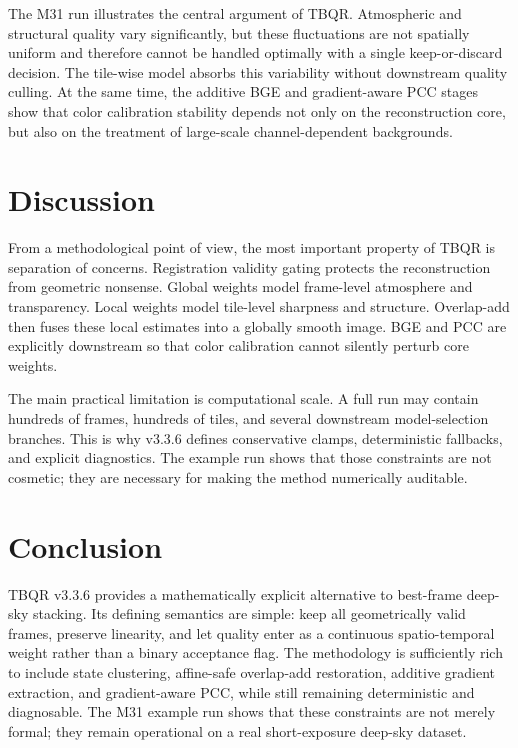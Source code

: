 \documentclass[10pt,twocolumn]{article}
\begin{document}
The M31 run illustrates the central argument of TBQR. Atmospheric and structural quality vary significantly, but these fluctuations are not spatially uniform and therefore cannot be handled optimally with a single keep-or-discard decision. The tile-wise model absorbs this variability without downstream quality culling. At the same time, the additive BGE and gradient-aware PCC stages show that color calibration stability depends not only on the reconstruction core, but also on the treatment of large-scale channel-dependent backgrounds.

\section{Discussion}

From a methodological point of view, the most important property of TBQR is separation of concerns. Registration validity gating protects the reconstruction from geometric nonsense. Global weights model frame-level atmosphere and transparency. Local weights model tile-level sharpness and structure. Overlap-add then fuses these local estimates into a globally smooth image. BGE and PCC are explicitly downstream so that color calibration cannot silently perturb core weights.

The main practical limitation is computational scale. A full run may contain hundreds of frames, hundreds of tiles, and several downstream model-selection branches. This is why v3.3.6 defines conservative clamps, deterministic fallbacks, and explicit diagnostics. The example run shows that those constraints are not cosmetic; they are necessary for making the method numerically auditable.

\section{Conclusion}

TBQR v3.3.6 provides a mathematically explicit alternative to best-frame deep-sky stacking. Its defining semantics are simple: keep all geometrically valid frames, preserve linearity, and let quality enter as a continuous spatio-temporal weight rather than a binary acceptance flag. The methodology is sufficiently rich to include state clustering, affine-safe overlap-add restoration, additive gradient extraction, and gradient-aware PCC, while still remaining deterministic and diagnosable. The M31 example run shows that these constraints are not merely formal; they remain operational on a real short-exposure deep-sky dataset.
\end{document}
